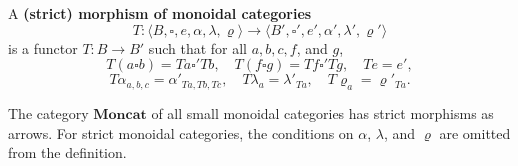 A \textbf{(strict) morphism of monoidal categories}
$$T : \langle B, \square, e, \alpha, \lambda, \varrho \rangle \to \langle B', \square', e', \alpha', \lambda', \varrho' \rangle$$
is a functor $T : B \to B'$ such that for all $a, b, c, f$, and $g$,
$$T(a \square b) = Ta \square' Tb, \quad T(f \square g) = Tf \square' Tg, \quad Te = e',$$
$$T\alpha_{a,b,c} = \alpha'_{Ta,Tb,Tc}, \quad T\lambda_a = \lambda'_{Ta}, \quad T\varrho_a = \varrho'_{Ta}.$$

The category $\mathbf{Moncat}$ of all small monoidal categories has strict morphisms as arrows. For strict monoidal categories, the conditions on $\alpha$, $\lambda$, and $\varrho$ are omitted from the definition.
